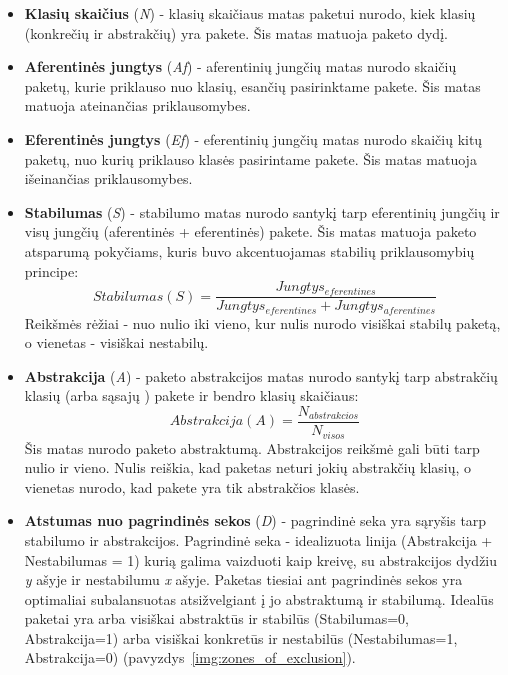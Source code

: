 \begin{itemize}
    \item \textbf{Klasių skaičius} (\textit{N}) - klasių skaičiaus matas paketui nurodo, kiek klasių (konkrečių ir abstrakčių) yra pakete.
    Šis matas matuoja paketo dydį.
    \item \textbf{Aferentinės jungtys } (\textit{Af}) - aferentinių jungčių matas nurodo
    skaičių paketų, kurie priklauso nuo klasių, esančių pasirinktame pakete.
    Šis matas matuoja ateinančias priklausomybes.
    \item \textbf{Eferentinės jungtys } (\textit{Ef}) - eferentinių jungčių matas nurodo skaičių kitų paketų,
    nuo kurių priklauso klasės pasirintame pakete.
    Šis matas matuoja išeinančias priklausomybes.
    \item \textbf{Stabilumas} (\textit{S}) - stabilumo matas nurodo santykį tarp eferentinių jungčių ir
    visų jungčių (aferentinės + eferentinės) pakete.
    Šis matas matuoja paketo atsparumą pokyčiams, kuris buvo akcentuojamas stabilių priklausomybių principe:
    \begin{equation}
        Stabilumas (S) =\frac{Jungtys_{eferentines}}{Jungtys_{eferentines} + Jungtys_{aferentines}}
    \end{equation}
    Reikšmės rėžiai - nuo nulio iki vieno, kur nulis nurodo visiškai stabilų paketą, o vienetas - visiškai nestabilų.
    \item \textbf{Abstrakcija} (\textit{A}) - paketo abstrakcijos matas nurodo santykį tarp abstrakčių klasių (arba sąsajų ) pakete ir bendro klasių skaičiaus:
    \begin{equation}
        Abstrakcija (A)=\frac{N_{abstrakcios}}{N_{visos}}
    \end{equation}
    Šis matas nurodo paketo abstraktumą.
    Abstrakcijos reikšmė gali būti tarp nulio ir vieno.
    Nulis reiškia, kad paketas neturi jokių abstrakčių klasių, o vienetas nurodo, kad pakete yra tik abstrakčios klasės.
    \item \textbf{Atstumas nuo pagrindinės sekos} (\textit{D}) -
    pagrindinė seka yra sąryšis tarp stabilumo ir abstrakcijos.
    Pagrindinė seka - idealizuota linija (Abstrakcija + Nestabilumas = 1) kurią galima vaizduoti kaip kreivę, su abstrakcijos dydžiu \textit{y} ašyje ir nestabilumu \textit{x} ašyje.
    Paketas tiesiai ant pagrindinės sekos yra optimaliai subalansuotas atsižvelgiant į jo abstraktumą ir stabilumą.
    Idealūs paketai yra arba visiškai abstraktūs ir stabilūs (Stabilumas=0, Abstrakcija=1) arba visiškai konkretūs ir nestabilūs (Nestabilumas=1, Abstrakcija=0) (pavyzdys~\ref{img:zones_of_exclusion}).

\end{itemize}
